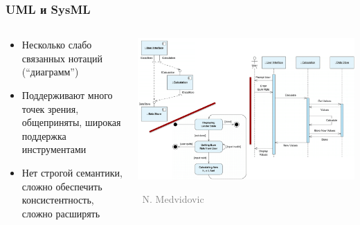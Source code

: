 \documentclass[xetex,mathserif,serif]{beamer}
\newcommand{\attribution}[1] {
    \vspace{-5mm}\begin{flushright}\begin{scriptsize}\textcolor{gray}{\textcopyright\, #1}\end{scriptsize}\end{flushright}
}
\begin{document}
    \begin{frame}
        \frametitle{UML и SysML}
        \begin{columns}
            \begin{column}{0.4\textwidth}
                \begin{small}
                    \begin{itemize}
                        \item Несколько слабо связанных нотаций (``диаграмм'')
                        \item Поддерживают много точек зрения, общеприняты, широкая поддержка инструментами
                        \item Нет строгой семантики, сложно обеспечить консистентность, сложно расширять
                    \end{itemize}
                \end{small}
            \end{column}
            \begin{column}{0.6\textwidth}
                \begin{center}
                    \includegraphics[width=\textwidth]{uml.png}
                    \attribution{N. Medvidovic}
                \end{center}
            \end{column}
        \end{columns}
    \end{frame}
\end{document}
